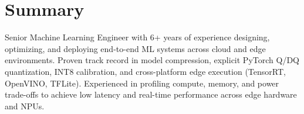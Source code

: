 \let\hrefWithoutArrow\href




    \newcommand{\AND}{\unskip
        \cleaders\copy\ANDbox\hskip\wd\ANDbox
        \ignorespaces
    }
    \newsavebox\ANDbox
    \sbox\ANDbox{$|$}


    \vspace{5 pt - 0.3 cm}


    \section{Summary}

        \begin{onecolentry}
            Senior Machine Learning Engineer with 6+ years of experience designing, optimizing, and deploying end-to-end ML systems across cloud and edge environments. Proven track record in model compression, explicit PyTorch Q/DQ quantization, INT8 calibration, and cross-platform edge execution (TensorRT, OpenVINO, TFLite). Experienced in profiling compute, memory, and power trade-offs to achieve low latency and real-time performance across edge hardware and NPUs.
        \end{onecolentry}

